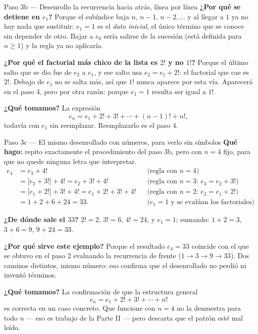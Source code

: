 \documentclass[11pt]{article}
\begin{document}
\begin{paso}{Paso 3b --- Desenrollo la recurrencia hacia atrás, línea por línea}
\textbf{¿Por qué se detiene en $e_1$?} Porque el subíndice baja $n,\,n-1,\,n-2,\dots$ y al llegar a $1$ ya no hay nada que sustituir: $e_1=1$ es el \emph{dato inicial}, el único término que se conoce sin depender de otro. Bajar a $e_0$ sería salirse de la sucesión (está definida para $n\ge1$) y la regla ya no aplicaría.

\textbf{¿Por qué el factorial más chico de la lista es $2!$ y no $1!$?} Porque el último salto que se dio fue de $e_2$ a $e_1$, y ese salto usa $e_2=e_1+2!$: el factorial que cae es $2!$. Debajo de $e_1$ no se salta más, así que $1!$ nunca aparece por esta vía. Aparecerá en el paso 4, pero por otra razón: porque $e_1=1$ resulta ser igual a $1!$.

\textbf{¿Qué tomamos?} La expresión
\[
e_n = e_1 + 2! + 3! + \cdots + (n-1)! + n! ,
\]
todavía con $e_1$ sin reemplazar. Reemplazarlo es el paso 4.
\end{paso}

\begin{paso}{Paso 3c --- El mismo desenrollado con números, para verlo sin símbolos}
\textbf{Qué hago:} repito exactamente el procedimiento del paso 3b, pero con $n=4$ fijo, para que no quede ninguna letra que interpretar.
\begin{align*}
e_4 &= e_3 + 4! &&\text{(regla con } n=4\text{)}\\
    &= \bigl[e_2 + 3!\bigr] + 4! = e_2 + 3! + 4! &&\text{(regla con } n=3\text{: } e_3=e_2+3!\text{)}\\
    &= \bigl[e_1 + 2!\bigr] + 3! + 4! = e_1 + 2! + 3! + 4! &&\text{(regla con } n=2\text{: } e_2=e_1+2!\text{)}\\
    &= 1 + 2 + 6 + 24 = 33 . &&\text{(}e_1=1\text{ y se evalúan los factoriales)}
\end{align*}

\textbf{¿De dónde sale el $33$?} $2!=2$, $3!=6$, $4!=24$, y $e_1=1$; sumando: $1+2=3$, $3+6=9$, $9+24=33$.

\textbf{¿Por qué sirve este ejemplo?} Porque el resultado $e_4=33$ coincide con el que se obtuvo en el paso 2 evaluando la recurrencia de frente ($1\to3\to9\to33$). Dos caminos distintos, mismo número: eso confirma que el desenrollado no perdió ni inventó términos.

\textbf{¿Qué tomamos?} La confirmación de que la estructura general
\[
e_n = e_1 + 2!+3!+\cdots+n!
\]
es correcta en un caso concreto. Que funcione con $n=4$ no la demuestra para todo $n$ --- eso es trabajo de la Parte II --- pero descarta que el patrón esté mal leído.
\end{paso}
\end{document}
